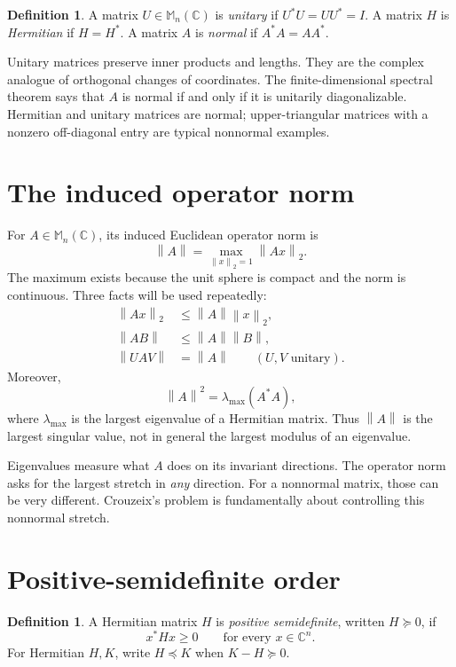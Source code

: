 \documentclass[11pt,oneside,openany]{book}
\theoremstyle{definition}
\newtheorem{definition}[theorem]{Definition}
\theoremstyle{remark}
\newcommand{\C}{\mathbb C}
\newcommand{\Mn}{\mathbb M_n(\C)}
\newcommand{\norm}[1]{\left\lVert #1\right\rVert}
\begin{document}
\begin{definition}
A matrix \(U\in\Mn\) is \emph{unitary} if \(U^*U=UU^*=I\).
A matrix \(H\) is \emph{Hermitian} if \(H=H^*\).
A matrix \(A\) is \emph{normal} if \(A^*A=AA^*\).
\end{definition}

Unitary matrices preserve inner products and lengths.  They are the
complex analogue of orthogonal changes of coordinates.  The
finite-dimensional spectral theorem says that \(A\) is normal if and
only if it is unitarily diagonalizable.  Hermitian and unitary
matrices are normal; upper-triangular matrices with a nonzero
off-diagonal entry are typical nonnormal examples.

\section{The induced operator norm}

For \(A\in\Mn\), its induced Euclidean operator norm is
\[
  \norm{A}=\max_{\norm{x}_2=1}\norm{Ax}_2.
\]
The maximum exists because the unit sphere is compact and the norm is
continuous.  Three facts will be used repeatedly:
\begin{align}
  \norm{Ax}_2&\leq\norm{A}\norm{x}_2,\\
  \norm{AB}&\leq\norm{A}\norm{B},\\
  \norm{UAV}&=\norm{A}\qquad(U,V\text{ unitary}).
\end{align}
Moreover,
\[
  \norm{A}^2=\lambda_{\max}(A^*A),
\]
where \(\lambda_{\max}\) is the largest eigenvalue of a Hermitian
matrix.  Thus \(\norm{A}\) is the largest singular value, not in
general the largest modulus of an eigenvalue.

\begin{intuitionbox}
Eigenvalues measure what \(A\) does on its invariant directions.
The operator norm asks for the largest stretch in \emph{any}
direction.  For a nonnormal matrix, those can be very different.
Crouzeix's problem is fundamentally about controlling this nonnormal
stretch.
\end{intuitionbox}

\section{Positive-semidefinite order}

\begin{definition}
A Hermitian matrix \(H\) is \emph{positive semidefinite}, written
\(H\succeq0\), if
\[
  x^*Hx\geq0\qquad\text{for every }x\in\C^n.
\]
For Hermitian \(H,K\), write \(H\preceq K\) when \(K-H\succeq0\).
\end{definition}
\end{document}
